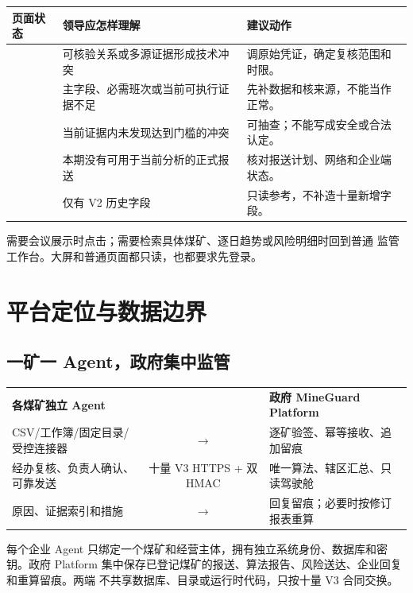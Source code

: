 \documentclass[UTF8,openany,zihao=-4,fontset=none]{ctexbook}
\begin{document}
\begin{longtable}{P{38mm}P{58mm}P{48mm}}
\toprule
\textbf{页面状态} & \textbf{领导应怎样理解} & \textbf{建议动作}\\
\midrule
{} & 可核验关系或多源证据形成技术冲突 & 调原始凭证，确定复核范围和时限。\\
 & 主字段、必需班次或当前可执行证据不足 & 先补数据和核来源，不能当作正常。\\
 & 当前证据内未发现达到门槛的冲突 & 可抽查；不能写成安全或合法认定。\\
 & 本期没有可用于当前分析的正式报送 & 核对报送计划、网络和企业端状态。\\
 & 仅有 V2 历史字段 & 只读参考，不补造十量新增字段。\\
\bottomrule
\end{longtable}

\begin{tipbox}
需要会议展示时点击；需要检索具体煤矿、逐日趋势或风险明细时回到普通
监管工作台。大屏和普通页面都只读，也都要求先登录。
\end{tipbox}

\tableofcontents
\clearpage

\chapter{平台定位与数据边界}

\section{一矿一 Agent，政府集中监管}

\begin{center}
\begin{tabularx}{0.95\textwidth}{Y c Y}
\textbf{各煤矿独立 Agent} & & \textbf{政府 MineGuard Platform}\\
CSV/工作簿/固定目录/受控连接器 & $\longrightarrow$ & 逐矿验签、幂等接收、追加留痕\\
经办复核、负责人确认、可靠发送 & 十量 V3 HTTPS + 双 HMAC & 唯一算法、辖区汇总、只读驾驶舱\\
原因、证据索引和措施 & $\longrightarrow$ & 回复留痕；必要时按修订报表重算\\
\end{tabularx}
\end{center}

每个企业 Agent 只绑定一个煤矿和经营主体，拥有独立系统身份、数据库和密钥。政府
Platform 集中保存已登记煤矿的报送、算法报告、风险送达、企业回复和重算留痕。两端
不共享数据库、目录或运行时代码，只按十量 V3 合同交换。
\end{document}
